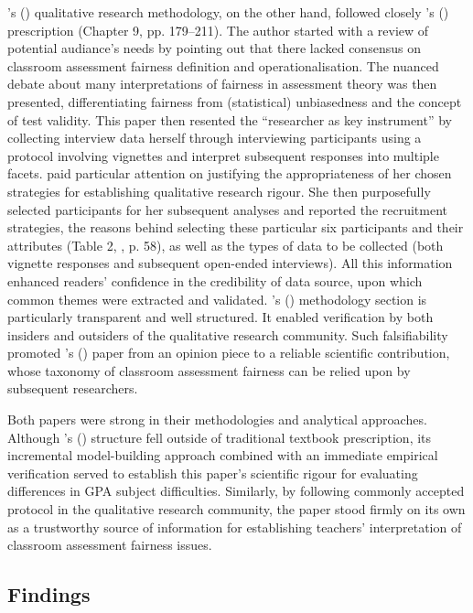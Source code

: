 \documentclass[
    a4paper,            %
    12pt,               %
    stu,                %
    noextraspace,       %
    floatsintext,       %
    biblatex,           %
    colorlinks=true,        %
    linkcolor=red,          %
    anchorcolor=black,      %
    citecolor=blue,         %
    urlcolor=blue,          %
    bookmarks=true,         %
    bookmarksopen=false,    %
    bookmarksnumbered=true  %
    margin=2cm              %
]{apa7}
\newcommand{\poscite}[1]{\citeauthor{#1}'s (\citeyear{#1})}
\begin{document}
\poscite{tierney:2014} qualitative research methodology, on the other hand, followed closely \poscite{creswell:2018} prescription (Chapter 9, pp. 179--211). The author started with a review of potential audiance's needs by pointing out that there lacked consensus on classroom assessment fairness definition and operationalisation. The nuanced debate about many interpretations of fairness in assessment theory was then presented, differentiating fairness from (statistical) unbiasedness and the concept of test validity. This paper then resented the ``researcher as key instrument'' \parencite[][p. 181]{creswell:2018} by collecting interview data herself through interviewing participants using a protocol involving vignettes and interpret subsequent responses into multiple facets. \citeauthor{tierney:2014} paid particular attention on justifying the appropriateness of her chosen strategies for establishing qualitative research rigour. She then purposefully selected participants for her subsequent analyses and reported the recruitment strategies, the reasons behind selecting these particular six participants and their attributes (Table 2, \textcite{tierney:2014}, p. 58), as well as the types of data to be collected (both vignette responses and subsequent open-ended interviews). All this information enhanced readers' confidence in the credibility of data source, upon which common themes were extracted and validated. \poscite{tierney:2014} methodology section is particularly transparent and well structured. It enabled verification by both insiders and outsiders of the qualitative research community. Such falsifiability promoted \poscite{tierney:2014} paper from an opinion piece to a reliable scientific contribution, whose taxonomy of classroom assessment fairness can be relied upon by subsequent researchers.

Both papers were strong in their methodologies and analytical approaches. Although \poscite{korobko:2008} structure fell outside of traditional textbook prescription, its incremental model-building approach combined with an immediate empirical verification served to establish this paper's scientific rigour for evaluating differences in GPA subject difficulties. Similarly, by following commonly accepted protocol in the qualitative research community, the \textcite{tierney:2014} paper stood firmly on its own as a trustworthy source of information for establishing teachers' interpretation of classroom assessment fairness issues.

\subsection{Findings}
\end{document}
